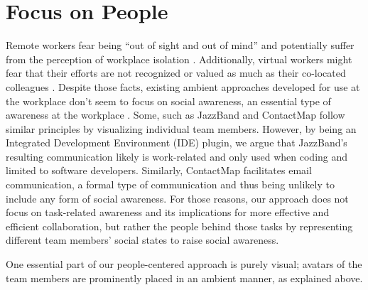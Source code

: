 \section{Focus on People}
Remote workers fear being \enquote{out of sight and out of mind} \autocite{bailey1999advantages} and potentially suffer from the perception of workplace isolation \autocite{mulki2009set, marshall2007workplace}. Additionally, virtual workers might fear that their efforts are not recognized or valued as much as their co-located colleagues \autocite{cooper2002telecommuting}. Despite those facts, existing ambient approaches developed for use at the workplace don't seem to focus on social awareness, an essential type of awareness at the workplace \autocite{greenberg1996awareness}. Some, such as JazzBand and ContactMap \autocite{cheng2003jazzing, whittaker2004contactmap} follow similar principles by visualizing individual team members. However, by being an Integrated Development Environment (IDE) plugin, we argue that JazzBand's resulting communication likely is work-related and only used when coding and limited to software developers. Similarly, ContactMap facilitates email communication, a formal type of communication and thus being unlikely to include any form of social awareness. For those reasons, our approach does not focus on task-related awareness and its implications for more effective and efficient collaboration, but rather the people behind those tasks by representing different team members' social states to raise social awareness.

One essential part of our people-centered approach is purely visual; avatars of the team members are prominently placed in an ambient manner, as explained above.

